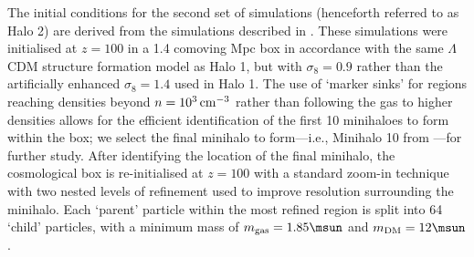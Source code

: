 The initial conditions for the second set of simulations (henceforth referred to as Halo 2) are derived from the simulations described in \citet{StacyBromm2013}.  These simulations were initialised at $z=100$ in a 1.4 comoving Mpc box in accordance with the same $\Lambda$CDM structure formation model as Halo 1, but with $\sigma_8 = 0.9$ rather than the artificially enhanced $\sigma_8 = 1.4$ used in Halo 1. The use of `marker sinks'  for regions reaching densities beyond $n=10^3\,{\rm cm}^{-3}$ rather than following the gas to higher densities allows for the efficient identification of the first 10 minihaloes to form within the box; we select the final minihalo to form---i.e., Minihalo 10 from \citet{StacyBromm2013}---for further study.  After identifying the location of the final minihalo, the cosmological box is re-initialised at $z=100$ with a standard zoom-in technique with two nested levels of refinement used to improve resolution surrounding the minihalo.  Each `parent' particle within the most refined region is split into 64 `child' particles, with a minimum mass of $m_{\rm gas}=1.85\msun$ and $m_{\rm \small DM}=12\msun$.